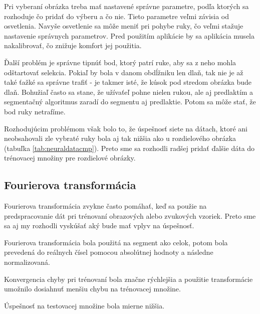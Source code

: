 Pri vyberaní obrázka treba mať nastavené správne parametre, podľa ktorých sa rozhoduje čo pridať do výberu a čo nie. Tieto parametre veľmi závisia od osvetlenia. Navyše osvetlenie sa môže meniť pri pohybe ruky, čo veľmi stažuje nastavenie správnych parametrov. Pred použitím aplikácie by sa aplikácia musela nakalibrovať, čo znižuje komfort jej použitia.

Ďalší problém je správne tipnúť bod, ktorý patrí ruke, aby sa z neho mohla odštartovať selekcia. Pokiaľ by bola v danom obdĺžniku len dlaň, tak nie je až také ťažké sa správne trafiť - je takmer isté, že kúsok pod stredom obrázka bude dlaň. Bohužiaľ často sa stane, že užívaťeľ pohne nielen rukou, ale aj predlaktím a segmentačný algoritmus zaradí do segmentu aj predlaktie. Potom sa môže stať, že bod ruky netrafíme.

Rozhodujúcim problémom však bolo to, že úspešnosť siete na dátach, ktoré ani neobsahovali zle vybraté ruky bola aj tak nižšia ako u rozdielového obrázka (tabuľka \ref{tab:neuraldatacmp}). Preto sme sa rozhodli radšej pridať ďalšie dáta do trénovacej množiny pre rozdielové obrázky.

\subsection{Fourierova transformácia}
Fourierova transformácia zvykne často pomáhať, keď sa použie na predspracovanie dát pri trénovaní obrazových alebo zvukových vzoriek. Preto sme sa aj my rozhodli vyskúšať aký bude mať vplyv na úspešnosť.

Fourierova transformácia bola použitá na segment ako celok, potom bola prevedená do reálnych čísel pomocou absolútnej hodnoty a následne normalizovaná.

Konvergencia chyby pri trénovaní bola značne rýchlejšia a použitie transformácie umožnilo dosiahnuť menšiu chybu na trénovacej množine.

Úspešnosť na testovacej množine bola mierne nižšia.
% 

